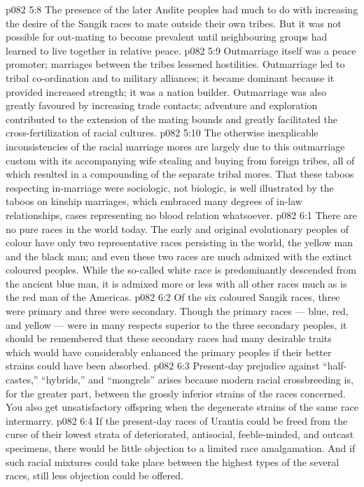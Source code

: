 \vs p082 5:8 The presence of the later Andite peoples had much to do with increasing the desire of the Sangik races to mate outside their own tribes. But it was not possible for out\hyp{}mating to become prevalent until neighbouring groups had learned to live together in relative peace.
\vs p082 5:9 Outmarriage itself was a peace promoter; marriages between the tribes lessened hostilities. Outmarriage led to tribal co\hyp{}ordination and to military alliances; it became dominant because it provided increased strength; it was a nation builder. Outmarriage was also greatly favoured by increasing trade contacts; adventure and exploration contributed to the extension of the mating bounds and greatly facilitated the cross\hyp{}fertilization of racial cultures.
\vs p082 5:10 The otherwise inexplicable inconsistencies of the racial marriage mores are largely due to this outmarriage custom with its accompanying wife stealing and buying from foreign tribes, all of which resulted in a compounding of the separate tribal mores. That these taboos respecting in\hyp{}marriage were sociologic, not biologic, is well illustrated by the taboos on kinship marriages, which embraced many degrees of in\hyp{}law relationships, cases representing no blood relation whatsoever.
\vs p082 6:1 There are no pure races in the world today. The early and original evolutionary peoples of colour have only two representative races persisting in the world, the yellow man and the black man; and even these two races are much admixed with the extinct coloured peoples. While the so\hyp{}called white race is predominantly descended from the ancient blue man, it is admixed more or less with all other races much as is the red man of the Americas.
\vs p082 6:2 Of the six coloured Sangik races, three were primary and three were secondary. Though the primary races --- blue, red, and yellow --- were in many respects superior to the three secondary peoples, it should be remembered that these secondary races had many desirable traits which would have considerably enhanced the primary peoples if their better strains could have been absorbed.
\vs p082 6:3 Present\hyp{}day prejudice against “half\hyp{}castes,” “hybrids,” and “mongrels” arises because modern racial crossbreeding is, for the greater part, between the grossly inferior strains of the races concerned. You also get unsatisfactory offspring when the degenerate strains of the same race intermarry.
\vs p082 6:4 If the present\hyp{}day races of Urantia could be freed from the curse of their lowest strata of deteriorated, antisocial, feeble\hyp{}minded, and outcast specimens, there would be little objection to a limited race amalgamation. And if such racial mixtures could take place between the highest types of the several races, still less objection could be offered.
